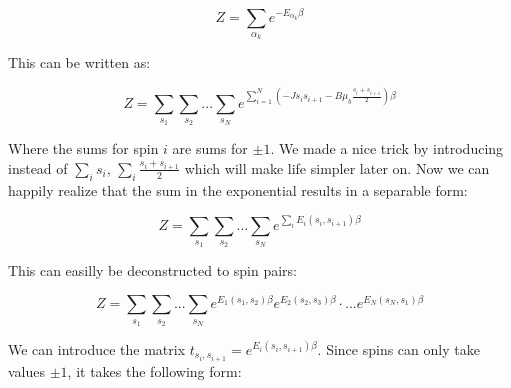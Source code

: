 \documentclass[12pt]{article}
\theoremstyle{plain}
\begin{document}
\vspace{2mm}

\begin{equation*}
    Z = \sum_{\alpha_k} e^{-E_{\alpha_k}\beta}
\end{equation*}

\vspace{2mm}

\par This can be written as:

\vspace{2mm}

\begin{equation*}
    Z = \sum_{s_1}\sum_{s_2}...\sum_{s_N} e^{\sum_{i=1}^{N}(-Js_i s_{i+1} - B\mu_{b}\frac{s_i + s_{i+1}}{2})\beta}
\end{equation*}

\vspace{2mm}

\par Where the sums for spin $i$ are sums for $\pm 1$. We made a nice trick by introducing
instead of $\sum_i s_i$, $\sum_{i}\frac{s_i + s_{i+1}}{2}$ which will make life simpler later on.
Now we can happily realize that the sum in the exponential results in a separable form:

\vspace{2mm}

\begin{equation*}
    Z = \sum_{s_1}\sum_{s_2}...\sum_{s_N} e^{\sum_{i}E_{i}(s_i, s_{i+1})\beta} 
\end{equation*}

\vspace{2mm}

\par This can easilly be deconstructed to spin pairs:

\vspace{2mm}

\begin{equation*}
    Z = \sum_{s_1}\sum_{s_2}...\sum_{s_N} e^{E_{1}(s_1, s_2)\beta}e^{E_{2}(s_2, s_3)\beta}\cdot ... e^{E_{N}(s_N, s_1)\beta} 
\end{equation*}

\vspace{2mm}

\par We can introduce the matrix  $t_{s_i, s_{i+1}} = e^{E_{i}(s_i, s_{i+1})\beta}$. Since spins can only
take values $\pm 1$, it takes the following form:

\vspace{2mm}
\end{document}
